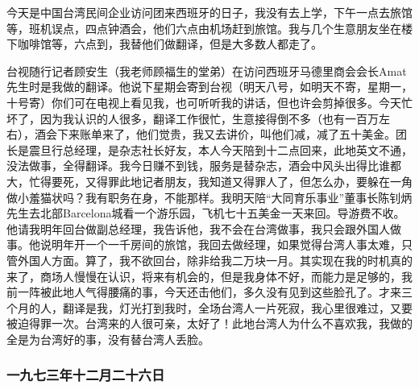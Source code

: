 \par {}
\par 今天是中国台湾民间企业访问团来西班牙的日子，我没有去上学，下午一点去旅馆等，班机误点，四点钟酒会，他们六点由机场赶到旅馆。我与几个生意朋友坐在楼下咖啡馆等，六点到，我替他们做翻译，但是大多数人都走了。
\par 台视随行记者顾安生（我老师顾福生的堂弟）在访问西班牙马德里商会会长Amat先生时是我做的翻译。他说下星期会寄到台视（明天八号，如明天不寄，星期一，十号寄）你们可在电视上看见我，也可听听我的讲话，但也许会剪掉很多。今天忙坏了，因为我认识的人很多，翻译工作很忙，生意接得倒不多（也有一百万左右），酒会下来账单来了，他们觉贵，我又去讲价，叫他们减，减了五十美金。团长是震旦行总经理，是杂志社长好友，本人今天陪到十二点回来，此地英文不通，没法做事，全得翻译。我今日赚不到钱，服务是替杂志，酒会中风头出得比谁都大，忙得要死，又得罪此地记者朋友，我知道又得罪人了，但怎么办，要躲在一角做小羞猫状吗？我有职务在身，不能那样。我明天陪“大同育乐事业”董事长陈钊炳先生去北部Barcelona城看一个游乐园，飞机七十五美金一天来回。导游费不收。他请我明年回台做副总经理，我告诉他，我不会在台湾做事，我只会跟外国人做事。他说明年开一个一千房间的旅馆，我回去做经理，如果觉得台湾人事太难，只管外国人方面。算了，我不欲回台，除非给我二万块一月。其实现在我的时机真的来了，商场人慢慢在认识，将来有机会的，但是我身体不好，而能力是足够的，我前一阵被此地人气得腰痛的事，今天还击他们，多久没有见到这些脸孔了。才来三个月的人，翻译是我，灯光打到我时，全场台湾人一片死寂，我心里很难过，又要被迫得罪一次。台湾来的人很可亲，太好了！此地台湾人为什么不喜欢我，我做的全是为台湾好的事，没有替台湾人丢脸。
\par {}


\subsubsection{一九七三年十二月二十六日}

